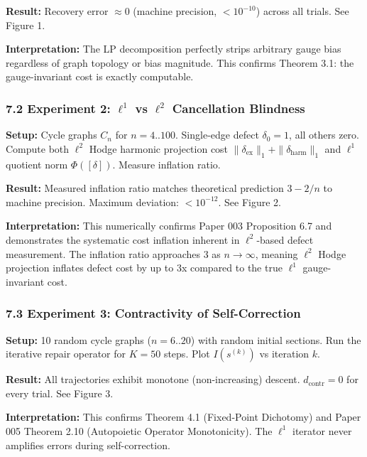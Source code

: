 \documentclass[
]{article}
\begin{document}
\textbf{Result:} Recovery error \(\approx 0\) (machine precision,
\(< 10^{-10}\)) across all trials. See Figure 1.

\textbf{Interpretation:} The LP decomposition perfectly strips arbitrary
gauge bias regardless of graph topology or bias magnitude. This confirms
Theorem 3.1: the gauge-invariant cost is exactly computable.

\subsubsection{\texorpdfstring{7.2 Experiment 2: \(\ell^1\) vs
\(\ell^2\) Cancellation
Blindness}{7.2 Experiment 2: \textbackslash ell\^{}1 vs \textbackslash ell\^{}2 Cancellation Blindness}}\label{experiment-2-ell1-vs-ell2-cancellation-blindness}

\textbf{Setup:} Cycle graphs \(C_n\) for \(n = 4..100\). Single-edge
defect \(\delta_0 = 1\), all others zero. Compute both \(\ell^2\) Hodge
harmonic projection cost
\(\|\delta_{\mathrm{ex}}\|_1 + \|\delta_{\mathrm{harm}}\|_1\) and
\(\ell^1\) quotient norm \(\Phi([\delta])\). Measure inflation ratio.

\textbf{Result:} Measured inflation ratio matches theoretical prediction
\(3 - 2/n\) to machine precision. Maximum deviation: \(< 10^{-12}\). See
Figure 2.

\textbf{Interpretation:} This numerically confirms Paper 003 Proposition
6.7 and demonstrates the systematic cost inflation inherent in
\(\ell^2\)-based defect measurement. The inflation ratio approaches 3 as
\(n \to \infty\), meaning \(\ell^2\) Hodge projection inflates defect
cost by up to 3x compared to the true \(\ell^1\) gauge-invariant cost.

\subsubsection{7.3 Experiment 3: Contractivity of
Self-Correction}\label{experiment-3-contractivity-of-self-correction}

\textbf{Setup:} 10 random cycle graphs (\(n = 6..20\)) with random
initial sections. Run the iterative repair operator for \(K = 50\)
steps. Plot \(I(s^{(k)})\) vs iteration \(k\).

\textbf{Result:} All trajectories exhibit monotone (non-increasing)
descent. \(d_{\mathrm{contr}} = 0\) for every trial. See Figure 3.

\textbf{Interpretation:} This confirms Theorem 4.1 (Fixed-Point
Dichotomy) and Paper 005 Theorem 2.10 (Autopoietic Operator
Monotonicity). The \(\ell^1\) iterator never amplifies errors during
self-correction.
\end{document}
